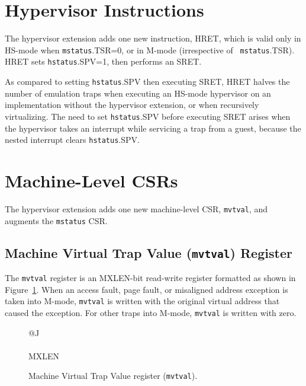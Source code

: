\section{Hypervisor Instructions}

The hypervisor extension adds one new instruction, HRET, which is valid only
in HS-mode when {\tt mstatus}.TSR=0, or in M-mode (irrespective of {\tt
mstatus}.TSR).  HRET sets {\tt hstatus}.SPV=1, then performs an SRET.

\begin{commentary}
As compared to setting {\tt hstatus}.SPV then executing SRET, HRET halves the
number of emulation traps when executing an HS-mode hypervisor on an
implementation without the hypervisor extension, or when recursively
virtualizing.  The need to set {\tt hstatus}.SPV before executing SRET arises
when the hypervisor takes an interrupt while servicing a trap from a guest,
because the nested interrupt clears {\tt hstatus}.SPV.
\end{commentary}

\section{Machine-Level CSRs}

The hypervisor extension adds one new machine-level CSR, {\tt mvtval}, and
augments the {\tt mstatus} CSR.

\subsection{Machine Virtual Trap Value ({\tt mvtval}) Register}

The {\tt mvtval} register is an MXLEN-bit read-write register formatted as shown
in Figure~\ref{mvtvalreg}.  When an access fault, page fault, or misaligned
address exception is taken into M-mode, {\tt mvtval} is
written with the original virtual address that caused the exception.
For other traps into M-mode, {\tt mvtval} is written with zero.

\begin{figure}[h!]
{\footnotesize
\begin{center}
\begin{tabular}{@{}J}
 \\
\hline
{} \\
\hline
MXLEN \\
\end{tabular}
\end{center}
}
\vspace{-0.1in}
\caption{Machine Virtual Trap Value register ({\tt mvtval}).}
\label{mvtvalreg}
\end{figure}

